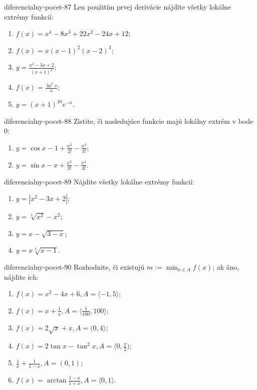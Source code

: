 \begin{defproblem}{diferencialny-pocet-87}
Len použitím prvej derivácie nájdite všetky lokálne extrémy funkcií:
\begin{multicols}{2}
\begin{enumerate}
    \item $f(x)=x^4-8x^3+22x^2-24x+12$;
	\item $f(x)=x(x-1)^2(x-2)^3$;
	\item $y=\frac{x^2-3x+2}{(x+1)^2}$;
	\item $f(x)=\frac{\ln^2 x}{x}$;
	\item $y=(x+1)^{10}e^{-x}$.
\end{enumerate}
\end{multicols}
\end{defproblem}

\begin{defproblem}{diferencialny-pocet-88}
Zistite, či nasledujúce funkcie majú lokálny extrém v bode $0$:
\begin{multicols}{2}
\begin{enumerate}
    \item $y=\cos x-1+\frac{x^2}{2!}-\frac{x^3}{3!}$;
	\item $y=\sin x-x+\frac{x^3}{3!}-\frac{x^4}{4!}$.
\end{enumerate}
\end{multicols}
\end{defproblem}

\begin{defproblem}{diferencialny-pocet-89}
Nájdite všetky lokálne extrémy funkcií:
\begin{multicols}{2}
\begin{enumerate}
    \item $y=|x^2-3x+2|$;
	\item $y=\sqrt[3]{x^2}-x^2$;
	\item $y=x-\sqrt{3-x}$;
	\item $y=x\sqrt[3]{x-1}$.
\end{enumerate}
\end{multicols}
\end{defproblem}

\begin{defproblem}{diferencialny-pocet-90}
Rozhodnite, či existujú $m:=\min_{x\in A}f(x)$; ak áno, nájdite ich:
\begin{enumerate}
\item $f(x)=x^2-4x+6,A=\langle -1,5 \rangle$;
\item $f(x)=x+\frac{1}{x},A=\langle \frac{1}{100},100\rangle$;
\item $f(x)=2\sqrt{x}+x,A=(0,4\rangle$;
\item $f(x)=2\tan x-\tan^2 x,A=\langle 0,\frac{\pi}{2})$;
\item $\frac{1}{x}+\frac{1}{1-x},A=(0,1)$;
\item $f(x)=\arctan \frac{1-x}{1+x},A=\langle 0,1 \rangle$.
\end{enumerate}
\end{defproblem}

